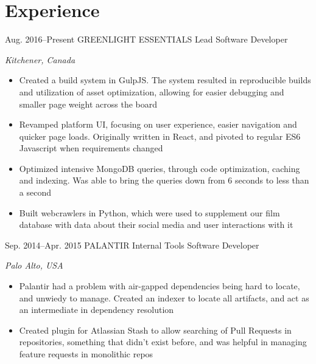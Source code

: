 \documentclass{resume-class}
\begin{document}


\section{Experience}

\begin{sectionlist}
	\entry
	{Aug. 2016--Present}
	{GREENLIGHT ESSENTIALS}
	{Lead Software Developer}
	{\emph {Kitchener, Canada}\\
		\begin{itemize}
		    \setlength{\itemsep}{0.2em}
			\item Created a build system in GulpJS. The system resulted in reproducible builds and utilization of asset optimization, allowing for easier debugging and smaller page weight across the board
			\item Revamped platform UI, focusing on user experience, easier navigation and quicker page loads. Originally written in React, and pivoted to regular ES6 Javascript when requirements changed
			\item Optimized intensive MongoDB queries, through code optimization, caching and indexing. Was able to bring the queries down from 6 seconds to less than a second
			\item Built webcrawlers in Python, which were used to supplement our film database with data about their social media and user interactions with it
		\end{itemize}
	}
	
	\entry
	{Sep. 2014--Apr. 2015}
	{PALANTIR}
	{Internal Tools Software Developer}
	{\emph {Palo Alto, USA} \\
		\begin{itemize}
		    \setlength{\itemsep}{0.2em}
			\item Palantir had a problem with air-gapped dependencies being hard to locate, and unwiedy to manage. Created an indexer to locate all  artifacts, and act as an intermediate in dependency resolution
			\item Created plugin for Atlassian Stash to allow searching of Pull Requests in repositories, something that didn't exist before, and was helpful in managing feature requests in monolithic repos
		\end{itemize}
	}
	

\end{sectionlist}
\end{document}
